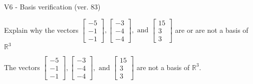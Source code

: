 \begin{exercise}
  \begin{exerciseTitle}V6 - Basis verification (ver. 83)\end{exerciseTitle}
  \begin{exerciseStatement}
    Explain why the vectors \(\left[\begin{array}{r}
-5 \\
-1 \\
-1
\end{array}\right] , \left[\begin{array}{r}
-3 \\
-4 \\
-4
\end{array}\right] , \text{ and } \left[\begin{array}{r}
15 \\
3 \\
3
\end{array}\right]\) are or are not a basis of \(\mathbb{R}^3\)	


  \end{exerciseStatement}
  \begin{exerciseAnswer}
   The vectors \(\left[\begin{array}{r}
-5 \\
-1 \\
-1
\end{array}\right] , \left[\begin{array}{r}
-3 \\
-4 \\
-4
\end{array}\right] , \text{ and } \left[\begin{array}{r}
15 \\
3 \\
3
\end{array}\right]\) 
  	 are not  a basis of \(\mathbb{R}^3\).
  


  \end{exerciseAnswer}
\end{exercise}